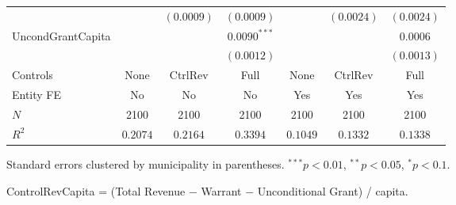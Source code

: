 \begin{table}[H]
\begin{minipage}{\textwidth}
\begin{tabular}{lcccccc}
         &  & $(0.0009)$ & $(0.0009)$ &  & $(0.0024)$ & $(0.0024)$ \\[4pt]
        UncondGrantCapita &  &  & $0.0090^{***}$ &  &  & $0.0006$ \\
         &  &  & $(0.0012)$ &  &  & $(0.0013)$ \\[4pt]
        \midrule
        Controls & None & CtrlRev & Full & None & CtrlRev & Full \\
        Entity FE & No & No & No & Yes & Yes & Yes \\
        $N$ & 2100 & 2100 & 2100 & 2100 & 2100 & 2100 \\
        $R^2$ & $0.2074$ & $0.2164$ & $0.3394$ & $0.1049$ & $0.1332$ & $0.1338$ \\
        \bottomrule
    \end{tabular}

    \vspace{6pt}
    {\scriptsize Standard errors clustered by municipality in parentheses. $^{***}p<0.01$, $^{**}p<0.05$, $^{*}p<0.1$.}

    {\scriptsize ControlRevCapita = (Total Revenue $-$ Warrant $-$ Unconditional Grant) / capita.}
    \end{minipage}
\end{table}